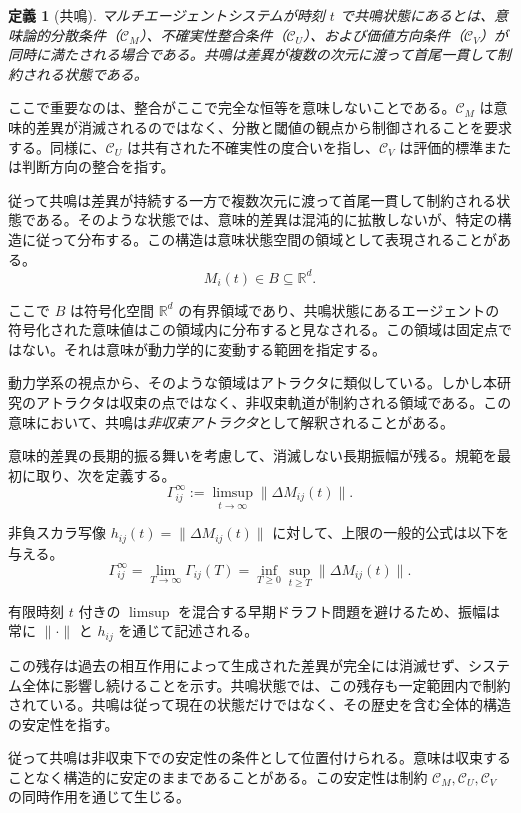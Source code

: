 \documentclass[11pt,a4paper]{article}
\theoremstyle{definition}
\newtheorem{definition}{定義}[section]
\begin{document}
\begin{definition}[共鳴]
\textit{マルチエージェントシステムが時刻 $t$ で共鳴状態にあるとは、意味論的分散条件（$\mathcal{C}_M$）、不確実性整合条件（$\mathcal{C}_U$）、および価値方向条件（$\mathcal{C}_V$）が同時に満たされる場合である。共鳴は差異が複数の次元に渡って首尾一貫して制約される状態である。}
\end{definition}

ここで重要なのは、整合がここで完全な恒等を意味しないことである。$\mathcal{C}_M$ は意味的差異が消滅されるのではなく、分散と閾値の観点から制御されることを要求する。同様に、$\mathcal{C}_U$ は共有された不確実性の度合いを指し、$\mathcal{C}_V$ は評価的標準または判断方向の整合を指す。

従って共鳴は差異が持続する一方で複数次元に渡って首尾一貫して制約される状態である。そのような状態では、意味的差異は混沌的に拡散しないが、特定の構造に従って分布する。この構造は意味状態空間の領域として表現されることがある。
\[
M_i(t) \in B \subseteq \mathbb{R}^d.
\]

ここで $B$ は符号化空間 $\mathbb{R}^d$ の有界領域であり、共鳴状態にあるエージェントの符号化された意味値はこの領域内に分布すると見なされる。この領域は固定点ではない。それは意味が動力学的に変動する範囲を指定する。

動力学系の視点から、そのような領域はアトラクタに類似している。しかし本研究のアトラクタは収束の点ではなく、非収束軌道が制約される領域である。この意味において、共鳴は\textit{非収束アトラクタ}として解釈されることがある。

意味的差異の長期的振る舞いを考慮して、消滅しない長期振幅が残る。規範を最初に取り、次を定義する。
\[
\Gamma_{ij}^{\infty} := \limsup_{t \to \infty} \|\Delta M_{ij}(t)\|.
\]

非負スカラ写像 $h_{ij}(t) = \|\Delta M_{ij}(t)\|$ に対して、上限の一般的公式は以下を与える。
\[
\Gamma_{ij}^{\infty} = \lim_{T \to \infty} \Gamma_{ij}(T) = \inf_{T \geq 0} \sup_{t \geq T} \|\Delta M_{ij}(t)\|.
\]

有限時刻 $t$ 付きの $\limsup$ を混合する早期ドラフト問題を避けるため、振幅は常に $\|\cdot\|$ と $h_{ij}$ を通じて記述される。

この残存は過去の相互作用によって生成された差異が完全には消滅せず、システム全体に影響し続けることを示す。共鳴状態では、この残存も一定範囲内で制約されている。共鳴は従って現在の状態だけではなく、その歴史を含む全体的構造の安定性を指す。

従って共鳴は非収束下での安定性の条件として位置付けられる。意味は収束することなく構造的に安定のままであることがある。この安定性は制約 $\mathcal{C}_M, \mathcal{C}_U, \mathcal{C}_V$ の同時作用を通じて生じる。
\end{document}
